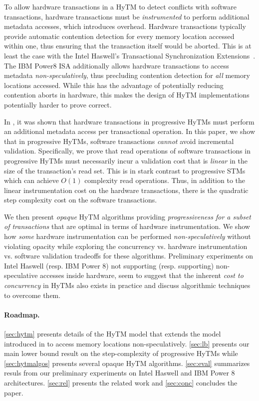 To allow hardware transactions in a HyTM to detect conflicts with software transactions, 
hardware transactions must be \emph{instrumented} to perform additional metadata accesses, which introduces overhead.
Hardware transactions typically provide automatic contention detection for every memory location accessed within one,
thus ensuring that the transaction itself would be aborted.
This is at least the case with the Intel Haswell's Transactional Synchronization Extensions~\cite{haswell}.
The IBM Power8 ISA additionally allows hardware transactions to access metadata \emph{non-speculatively}, thus precluding
contention detection for \emph{all} memory locations accessed. While this has the advantage of potentially reducing contention aborts
in hardware, this makes the design of HyTM implementations potentially harder to prove correct.

In \cite{htmdisc15}, it was shown that hardware transactions in progressive HyTMs must perform
an additional metadata access per transactional operation.
In this paper, we show that in progressive HyTMs, 
software transactions \textit{cannot} avoid incremental validation.
Specifically, we prove that read operations of software transactions in progressive HyTMs
must necessarily incur a validation cost that is \emph{linear} 
in the size of the transaction's read set. 
This is in stark contrast to progressive STMs which can achieve $O(1)$ complexity read operations.
Thus, in addition to the linear instrumentation cost on the hardware transactions, there is the quadratic
step complexity cost on the software transactions.

We then present \emph{opaque} HyTM algorithms providing \emph{progressiveness for a subset of transactions} that are  %
optimal in terms of hardware instrumentation. We show 
how \emph{some} hardware instrumentation can be performed \textit{non-speculatively} without violating opacity while exploring the concurrency vs. hardware instrumentation vs. software validation
tradeoffs for these algorithms.
Preliminary experiments on Intel Haswell (resp. IBM Power 8) not supporting (resp. supporting) non-speculative accesses inside hardware,
seem to suggest that the inherent \emph{cost to concurrency} in HyTMs also exists in practice and discuss algorithmic techniques to overcome them.

\paragraph{Roadmap.}
\cref{sec:hytm} presents details of the HyTM model that extends the model introduced in \cite{htmdisc15} 
to access memory locations non-speculatively.
\cref{sec:lb} presents our main lower bound result on the step-complexity of progressive HyTMs
while \cref{sec:hytmalgos} presents several opaque HyTM algorithms.
\cref{sec:eval} summarizes resuls from our preliminary experiments on Intel Haswell and IBM Power 8 architectures.
\cref{sec:rel} presents the related work and \cref{sec:conc} concludes the paper.
%